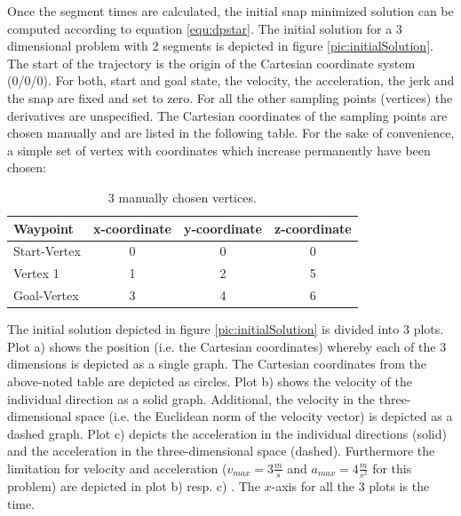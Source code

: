 Once the segment times are calculated, the initial snap minimized solution can be computed according to equation \ref{equ:dpstar}. The initial solution for a 3 dimensional problem with 2 segments is depicted in figure \ref{pic:initialSolution}. The start of the trajectory is the origin of the Cartesian coordinate system (0/0/0). For both, start and goal state, the velocity, the acceleration, the jerk and the snap are fixed and set to zero. For all the other sampling points (vertices) the derivatives are unspecified. The Cartesian coordinates of the sampling points are chosen manually and are listed in the following table.  For the sake of convenience, a simple set of vertex with coordinates which increase permanently have been chosen:

\begin{table}[H] 
\begin{center}
    \begin{tabular}{ | l | c | c | c |}
    \hline
    Waypoint & x-coordinate & y-coordinate & z-coordinate\\ \hline
    Start-Vertex & 0 & 0 & 0 \\ \hline
    Vertex 1 & 1 & 2 & 5\\ \hline
    Goal-Vertex & 3 & 4 & 6\\
    \hline
    \end{tabular}
    \caption{3 manually chosen  vertices.}
    \label{tab:vertices}
\end{center}
\end{table}


The initial solution depicted in figure \ref{pic:initialSolution} is divided into 3 plots. Plot a) shows the position (i.e. the Cartesian coordinates) whereby each of the 3 dimensions is depicted as a single graph. The Cartesian coordinates from the above-noted table are depicted as circles. 
Plot b) shows the velocity of the individual direction as a solid graph. Additional, the velocity in the three-dimensional space (i.e. the Euclidean norm of the velocity vector) is depicted as a dashed graph.
Plot c) depicts the acceleration in the individual directions (solid) and the acceleration in the three-dimensional space (dashed). Furthermore the limitation for velocity and acceleration ($v_{max} = 3 \frac{m}{s}$ and $a_{max} = 4 \frac{m}{s^2}$ for this problem) are depicted in plot b) resp. c) . The $x$-axis for all the 3 plots is the time. \newline


